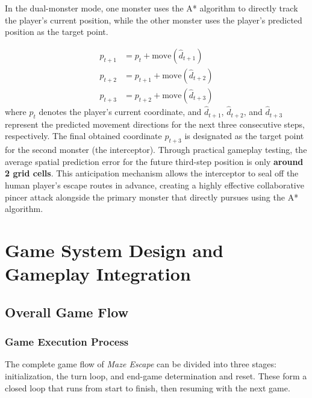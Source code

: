 \documentclass[12pt,a4paper]{article}
\begin{document}
In the dual-monster mode, one monster uses the A* algorithm to directly track the player's current position, while the other monster uses the player's predicted position as the target point.

\begin{align*}
    p_{t+1} &= p_t + \text{move}(\hat{d}_{t+1}) \\
    p_{t+2} &= p_{t+1} + \text{move}(\hat{d}_{t+2}) \\
    p_{t+3} &= p_{t+2} + \text{move}(\hat{d}_{t+3})
\end{align*}
where $p_t$ denotes the player's current coordinate, and $\hat{d}_{t+1}$, $\hat{d}_{t+2}$, and $\hat{d}_{t+3}$ represent the predicted movement directions for the next three consecutive steps, respectively. The final obtained coordinate $p_{t+3}$ is designated as the target point for the second monster (the interceptor). Through practical gameplay testing, the average spatial prediction error for the future third-step position is only \textbf{around 2 grid cells}. This anticipation mechanism allows the interceptor to seal off the human player's escape routes in advance, creating a highly effective collaborative pincer attack alongside the primary monster that directly pursues using the A* algorithm.

\section{Game System Design and Gameplay Integration}

\subsection{Overall Game Flow}

\subsubsection{Game Execution Process}

The complete game flow of \textit{Maze Escape} can be divided into three stages: initialization, the turn loop, and end-game determination and reset. These form a closed loop that runs from start to finish, then resuming with the next game.
\end{document}
